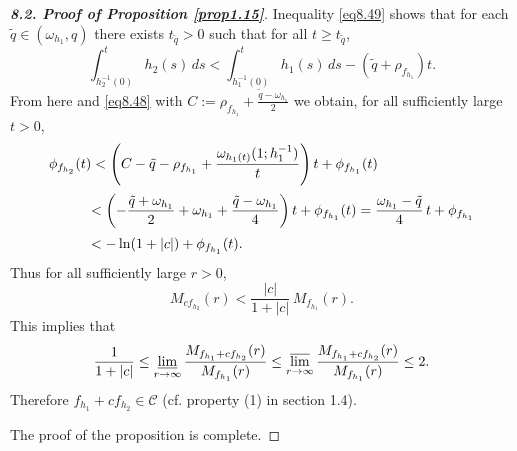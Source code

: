 \documentclass[11pt, oneside]{amsart}
\begin{document}
\begin{proof}[{\bf 8.2. Proof of Proposition \ref{prop1.15}}]
Inequality \eqref{eq8.49} shows that for each $\tilde q\in \left(\omega_{h_1},q\right)$  there exists $t_{\tilde q}>0$ such that for all $t\ge t_{\tilde q}$,
\[
\int_{h_2^{-1}(0)}^t h_2(s)\, ds< \int_{h_1^{-1}(0)}^t h_1(s)\, ds - (\tilde q+\rho_{f_{h_1}})t.
\]
From here and \eqref{eq8.48}  with $C:=\rho_{f_{h_1}}+\frac{\tilde q-\omega_{h_1}}{2}$ we obtain, for all sufficiently large $t>0$,
\[
\begin{array}{l}
\displaystyle
\phi_{f_{h_2}}(t)< \left(C-\tilde q-\rho_{f_{h_1}}+\frac{\omega_{h_1(t)}(1;h_1^{-1})}{t}\right)t +\phi_{f_{h_1}}(t)\medskip\\
\displaystyle \qquad \quad <
\left(-\frac{\tilde q+\omega_{h_1}}{2}+\omega_{h_1}+\frac{\tilde q-\omega_{h_1}}{4}\right)t +\phi_{f_{h_1}}(t)=\frac{\omega_{h_1}-\tilde q}{4}\, t +\phi_{f_{h_1}}\medskip\\
\displaystyle\qquad\quad<-\ln (1+|c|)+\phi_{f_{h_1}}(t).
\end{array}
\]
Thus for all sufficiently large $r>0$,
\[
M_{cf_{h_2}}(r)<\frac{|c|}{1+|c|}\, M_{f_{h_1}}(r).
\]
This implies that
\[
\frac{1}{1+|c|}\le\varliminf_{r\rightarrow\infty}\frac{M_{f_{h_1}+cf_{h_2}}(r)}{ M_{f_{h_1}}(r)}\le\varlimsup_{r\rightarrow\infty}\frac{M_{f_{h_1}+cf_{h_2}}(r)}{ M_{f_{h_1}}(r)}\le 2.
\]
Therefore $f_{h_1}+cf_{h_2}\in\mathscr C$ (cf. property (1) in section 1.4).

The proof of the proposition is complete.
\end{proof}
\end{document}
